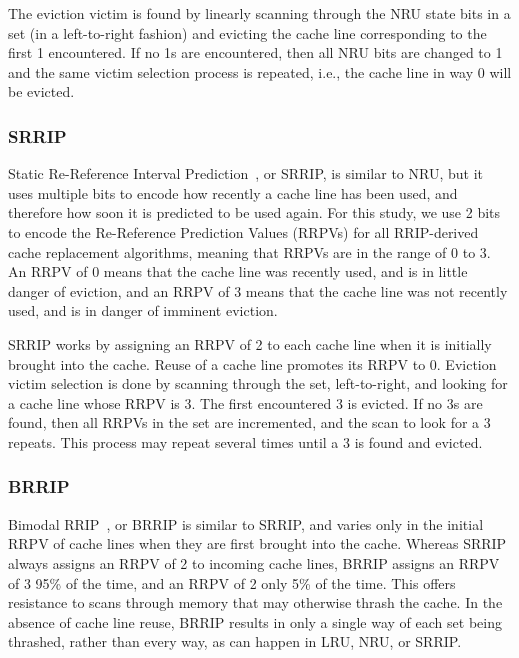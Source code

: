 The eviction victim is found by linearly scanning through the NRU state bits in a set (in a left-to-right fashion) and evicting the cache line corresponding to the first 1 encountered.  If no 1s are encountered, then all NRU bits are changed to 1 and the same victim selection process is repeated, i.e., the cache line in way 0 will be evicted.
\subsubsection{SRRIP}

Static Re-Reference Interval Prediction~\cite{jaleeltheobald10}, or SRRIP, is similar to NRU, but it uses multiple bits to encode how recently a cache line has been used, and therefore how soon it is predicted to be used again.  For this study, we use 2 bits to encode the Re-Reference Prediction Values (RRPVs) for all RRIP-derived cache replacement algorithms, meaning that RRPVs are in the range of 0 to 3.  An RRPV of 0 means that the cache line was recently used, and is in little danger of eviction, and an RRPV of 3 means that the cache line was not recently used, and is in danger of imminent eviction.

SRRIP works by assigning an RRPV of 2 to each cache line when it is initially brought into the cache.  Reuse of a cache line promotes its RRPV to 0.  Eviction victim selection is done by scanning through the set, left-to-right, and looking for a cache line whose RRPV is 3.  The first encountered 3 is evicted.  If no 3s are found, then all RRPVs in the set are incremented, and the scan to look for a 3 repeats.  This process may repeat several times until a 3 is found and evicted.

\subsubsection{BRRIP}

Bimodal RRIP~\cite{jaleeltheobald10}, or BRRIP is similar to SRRIP, and varies only in the initial RRPV of cache lines when they are first brought into the cache.  Whereas SRRIP always assigns an RRPV of 2 to incoming cache lines, BRRIP assigns an RRPV of 3 95\% of the time, and an RRPV of 2 only 5\% of the time.  This offers resistance to scans through memory that may otherwise thrash the cache.  In the absence of cache line reuse, BRRIP results in only a single way of each set being thrashed, rather than every way, as can happen in LRU, NRU, or SRRIP.

